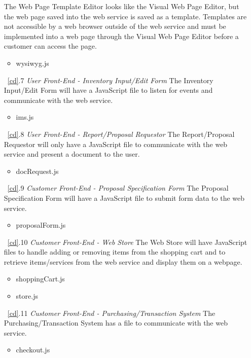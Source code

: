 \documentclass{article}
\begin{document}
\begin{enumerate}
        The Web Page Template Editor looks like the Visual Web Page Editor, but
        the web page saved into the web service is saved as a template.  Templates
        are not accessible by a web browser outside of the web service and must be implemented
        into a web page through the Visual Web Page Editor before a customer can
        access the page.
        \begin{itemize}
            \item wysiwyg.js
        \end{itemize}
    \item[~\ref{cd}.7 ] \emph{User Front-End - Inventory Input/Edit Form}
        The Inventory Input/Edit Form will have a JavaScript file to listen for
        events and communicate with the web service.
        \begin{itemize}
            \item ims.js
        \end{itemize}
    \item[~\ref{cd}.8 ] \emph{User Front-End - Report/Proposal Requestor}
        The Report/Proposal Requestor will only have a JavaScript file to
        communicate with the web service and present a document to the user.
        \begin{itemize}
            \item docRequest.js
        \end{itemize}
    \item[~\ref{cd}.9 ] \emph{Customer Front-End - Proposal Specification Form}
        The Proposal Specification Form will have a JavaScript file to submit
        form data to the web service.
        \begin{itemize}
            \item proposalForm.js
        \end{itemize}
    \item[~\ref{cd}.10 ] \emph{Customer Front-End - Web Store}
        The Web Store will have JavaScript files to handle adding or removing
        items from the shopping cart and to retrieve items/services from the
        web service and display them on a webpage.
        \begin{itemize}
            \item shoppingCart.js
            \item store.js
        \end{itemize}
    \item[~\ref{cd}.11 ] \emph{Customer Front-End - Purchasing/Transaction System}
        The Purchasing/Transaction System has a file to communicate with the
        web service.
        \begin{itemize}
            \item checkout.js
        \end{itemize}
\end{enumerate}
\end{document}
